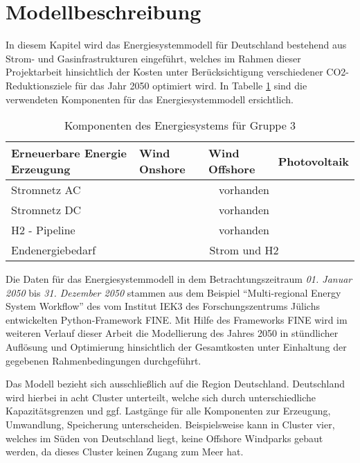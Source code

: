 \section{Modellbeschreibung}
\label{chap:modellbeschreibung}
In diesem Kapitel wird das Energiesystemmodell für Deutschland bestehend aus Strom- und Gasinfrastrukturen eingeführt, welches im Rahmen dieser Projektarbeit hinsichtlich der Kosten unter Berücksichtigung verschiedener CO2-Reduktionsziele für das Jahr 2050 optimiert wird. In Tabelle \ref{tab:systemdesign2} sind die verwendeten Komponenten für das Energiesystemmodell ersichtlich.

\begin{table}[ht!]
    \begin{tabular}{|lcll|}
        \hline
        \multicolumn{1}{|l|}{Erneuerbare Energie Erzeugung} & \multicolumn{1}{l|}{Wind Onshore} & \multicolumn{1}{l|}{Wind Offshore} & Photovoltaik \\ \hline
        \multicolumn{1}{|l|}{Stromnetz AC}     & \multicolumn{3}{c|}{vorhanden}                \\ \hline
        \multicolumn{1}{|l|}{Stromnetz DC}     & \multicolumn{3}{c|}{vorhanden}                \\ \hline
        \multicolumn{1}{|l|}{H2 - Pipeline}    & \multicolumn{3}{c|}{vorhanden}                \\ \hline
        \multicolumn{1}{|l|}{Endenergiebedarf} & \multicolumn{3}{c|}{Strom und H2} \\ \hline
    \end{tabular}
    \caption{Komponenten des Energiesystems für Gruppe 3}
    \label{tab:systemdesign2}
\end{table}

Die Daten für das Energiesystemmodell in dem Betrachtungszeitraum \textit{01. Januar 2050} bis \textit{31. Dezember 2050} stammen aus dem Beispiel ``Multi-regional Energy System Workflow'' des vom Institut IEK3 des Forschungszentrums Jülichs entwickelten Python-Framework FINE. 
Mit Hilfe des Frameworks FINE wird im weiteren Verlauf dieser Arbeit die Modellierung des Jahres 2050 in stündlicher Auflösung und Optimierung hinsichtlich der Gesamtkosten unter Einhaltung der gegebenen Rahmenbedingungen durchgeführt.

Das Modell bezieht sich ausschließlich auf die Region Deutschland.  Deutschland wird hierbei in acht Cluster unterteilt, welche sich durch unterschiedliche Kapazitätsgrenzen und ggf. Lastgänge für alle Komponenten zur Erzeugung, Umwandlung, Speicherung unterscheiden. Beispielsweise kann in Cluster vier, welches im Süden von Deutschland liegt, keine Offshore Windparks gebaut werden, da dieses Cluster keinen Zugang zum Meer hat. 

